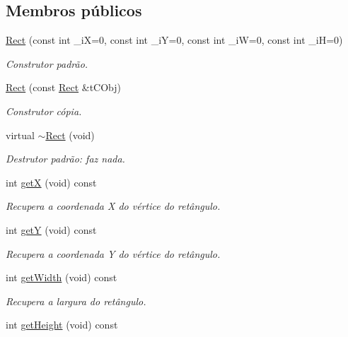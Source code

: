 \subsection*{Membros públicos}
\begin{DoxyCompactItemize}
\item 
\hyperlink{classrectangle_1_1Rect_a106f73f341700ba494effd45577c0507}{Rect} (const int \-\_\-i\-X=0, const int \-\_\-i\-Y=0, const int \-\_\-i\-W=0, const int \-\_\-i\-H=0)
\begin{DoxyCompactList}\small\item\em Construtor padr\~{a}o. \end{DoxyCompactList}\item 
\hyperlink{classrectangle_1_1Rect_a88fab37b78184456e5300cf6d8d06d79}{Rect} (const \hyperlink{classrectangle_1_1Rect}{Rect} \&t\-C\-Obj)
\begin{DoxyCompactList}\small\item\em Construtor c\'{o}pia. \end{DoxyCompactList}\item 
virtual \hyperlink{classrectangle_1_1Rect_acff62a31b8bafc67508dbf7f719cf932}{$\sim$\-Rect} (void)
\begin{DoxyCompactList}\small\item\em Destrutor padr\~{a}o\-: faz nada. \end{DoxyCompactList}\item 
int \hyperlink{classrectangle_1_1Rect_a8db7151039db46d0b853ec7ad5651b82}{get\-X} (void) const 
\begin{DoxyCompactList}\small\item\em Recupera a coordenada X do v\'{e}rtice do ret\^{a}ngulo. \end{DoxyCompactList}\item 
int \hyperlink{classrectangle_1_1Rect_a8fe066a16e1d9ce9978da34837f9912a}{get\-Y} (void) const 
\begin{DoxyCompactList}\small\item\em Recupera a coordenada Y do v\'{e}rtice do ret\^{a}ngulo. \end{DoxyCompactList}\item 
int \hyperlink{classrectangle_1_1Rect_a474a45df7293c6c5512463bb5a19f60b}{get\-Width} (void) const 
\begin{DoxyCompactList}\small\item\em Recupera a largura do ret\^{a}ngulo. \end{DoxyCompactList}\item 
int \hyperlink{classrectangle_1_1Rect_a0529af65f975bf15e9807923ba0ab8e6}{get\-Height} (void) const 

\end{DoxyCompactItemize}
